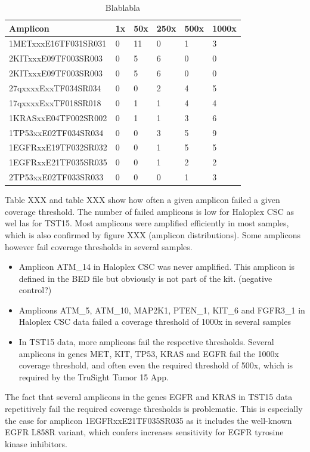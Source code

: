 \begin{table}[!htbp]
  \caption[failed_halo]{Blablabla}
  \centering
    \begin{tabular}{|p{5cm}||p{1.1cm}|p{1.1cm}|p{1.1cm}|p{1.1cm}|p{1.1cm}|}
    \hline
    Amplicon & 1x & 50x & 250x & 500x & 1000x \\ \hline \hline
    1METxxxE16TF031SR031 & 0 & 11 & 0 & 1 & 3 \\
    2KITxxxE09TF003SR003 & 0 & 5 & 6 & 0 & 0 \\
    2KITxxxE09TF003SR003 & 0 & 5 & 6 & 0 & 0 \\
    27qxxxxExxTF034SR034 & 0 & 0 & 2 & 4 & 5 \\
    17qxxxxExxTF018SR018 & 0 & 1 & 1 & 4 & 4 \\
    1KRASxxE04TF002SR002 & 0 & 1 & 1 & 3 & 6 \\
    1TP53xxE02TF034SR034 & 0 & 0 & 3 & 5 & 9 \\
    1EGFRxxE19TF032SR032 & 0 & 0 & 1 & 5 & 5 \\
    1EGFRxxE21TF035SR035 & 0 & 0 & 1 & 2 & 2 \\
    2TP53xxE02TF033SR033 & 0 & 0 & 0 & 1 & 3 \\
    \hline
  \end{tabular}
\end{table}


Table XXX and table XXX show how often a given amplicon failed a given coverage
threshold. The number of failed amplicons is low for Haloplex CSC as wel las for TST15.
Most amplicons were amplified efficiently in most samples, which is also confirmed by figure XXX (amplicon distributions). Some amplicons however
fail coverage thresholds in several samples.
\begin{itemize}
    \item Amplicon ATM\_14 in Haloplex CSC was never amplified. This amplicon is defined in the BED file but obviously is not part of the kit. (negative control?)
    \item Amplicons ATM\_5, ATM\_10, MAP2K1, PTEN\_1, KIT\_6 and FGFR3\_1 in Haloplex CSC data failed a coverage threshold of 1000x in several samples
    \item In TST15 data, more amplicons fail the respective thresholds. Several amplicons in genes MET, KIT, TP53, KRAS and EGFR fail the 1000x coverage threshold, and often even the required threshold of 500x, which is required by the TruSight Tumor 15 App.
\end{itemize}

The fact that several amplicons in the genes EGFR and KRAS in TST15 data
repetitively fail the required coverage thresholds is problematic. This is
especially the case for amplicon 1EGFRxxE21TF035SR035 as it includes the
well-known EGFR L858R variant, which confers increases sensitivity for EGFR
tyrosine kinase inhibitors.

